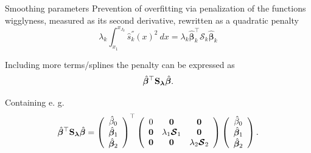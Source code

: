 \documentclass[xcolor=dvipsnames]{beamer}
\begin{document}
\begin{frame}{Smoothing parameters}
Prevention of overfitting via penalization of the functions wigglyness, measured as its second derivative, rewritten as a quadratic penalty
  \begin{equation}
    \lambda_k \displaystyle \int_{x_1}^{x_{J_k}} \hat{s}_k^{''}(x)^2 \ dx =
    \lambda_k \hat{\bm{\beta}}_k^\top \bm{\mathcal{S}}_k \hat{\bm{\beta}}_k
  \end{equation}

Including more terms/splines the penalty can be expressed as
  \begin{equation}
    \hat{\bm{\beta}}^\top \text{\textbf{S}}_{\bm{\lambda}} \hat{\bm{\beta}}.
    \label{eq:quadratic-pen}
  \end{equation}

Containing e. g.
  \begin{equation}
    \hat{\bm{\beta}}^\top \text{\textbf{S}}_{\bm{\lambda}} \hat{\bm{\beta}} =
    \left(
    \begin{array}{c}
      \hat{\beta}_0      \\
      \hat{\bm{\beta}}_1 \\
      \hat{\bm{\beta}}_2 \\
    \end{array}
    \right)^\top
    \left(
    \begin{array}{ccc}
      0      & \bm{0}                       & \bm{0}                       \\
      \bm{0} & \lambda_1 \bm{\mathcal{S}}_1 & \bm{0}                       \\
      \bm{0} & \bm{0}                       & \lambda_2 \bm{\mathcal{S}}_2 \\
    \end{array}
    \right)
    \left(
    \begin{array}{c}
      \hat{\beta}_0      \\
      \hat{\bm{\beta}}_1 \\
      \hat{\bm{\beta}}_2 \\
    \end{array}
    \right).
  \end{equation}
\end{frame}
\end{document}
